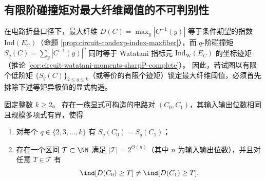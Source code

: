 \subsection{有限阶碰撞矩对最大纤维阈值的不可判别性}\label{subsec:op-algebra-collision-moment-camouflage-maxfiber}
在电路折叠口径下，最大纤维 \(D(C)=\max_y|C^{-1}(y)|\) 等于条件期望的指数 \(\mathrm{Ind}(E_C)\)（命题 \ref{prop:circuit-condexp-index-maxfiber}），而 \(q\)-阶碰撞矩 \(S_q(C)=\sum_y|C^{-1}(y)|^q\) 同时等于 Watatani 指标元 \(\mathrm{Ind}_{\mathrm W}(E_C)\) 的坐标迹矩（推论 \ref{cor:circuit-watatani-moments-sharpP-complete}）。
因此，若试图以有限个低阶矩 \(\{S_q(C)\}_{2\le q\le k}\)（或等价的有限个迹矩）锁定最大纤维阈值，必须首先排除下述等矩异极值的显式构造。

\begin{theorem}\label{thm:circuit-prouhet-collision-moment-camouflage-maxfiber}
固定整数 \(k\ge 2\)。
存在一族显式可构造的电路对 \((C_0,C_1)\)，其输入输出位数相同且规模多项式有界，使得
\begin{enumerate}
  \item 对每个 \(q\in\{2,3,\dots,k\}\) 有 \(S_q(C_0)=S_q(C_1)\)；
  \item 存在一个区间 \(\mathcal T\subset\NN\) 满足 \(|\mathcal T|=2^{\Theta(n)}\)（其中 \(n\) 为输入输出位数），并且对任意 \(T\in\mathcal T\) 有
  \[
  \ind[D(C_0)\ge T]\ne \ind[D(C_1)\ge T].
  \]
\end{enumerate}
\end{theorem}
